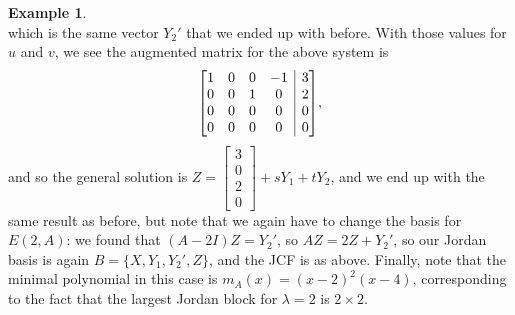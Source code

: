 \documentclass[12pt,letterpaper]{article}
\makeatletter
\theoremstyle{definition}
\newtheorem{example}{Example}
\newenvironment{amatrix}[1]{%
  \left[\begin{array}{@{}*{#1}{c}|c@{}}
}{%
  \end{array}\right]
}
\makeatother
\begin{document}
\begin{example}
\[\]
which is the same vector $Y_2'$ that we ended up with before. With those values for $u$ and $v$, we see the augmented matrix for the above system is
\[
 \begin{amatrix}{4}
  1&0&0&-1&3\\0&0&1&0&2\\0&0&0&0&0\\0&0&0&0&0
 \end{amatrix},
\]
and so the general solution is $Z=\begin{bmatrix}3\\0\\2\\0\end{bmatrix}+sY_1+tY_2$, and we end up with the same result as before, but note that we again have to change the basis for $E(2,A)$: we found that $(A-2I)Z=Y_2'$, so $AZ=2Z+Y_2'$, so our Jordan basis is again $B=\{X,Y_1,Y_2',Z\}$, and the JCF is as above. Finally, note that the minimal polynomial in this case is $m_A(x) = (x-2)^2(x-4)$, corresponding to the fact that the largest Jordan block for $\lambda =2$ is $2\times 2$.


\end{example}
\end{document}
